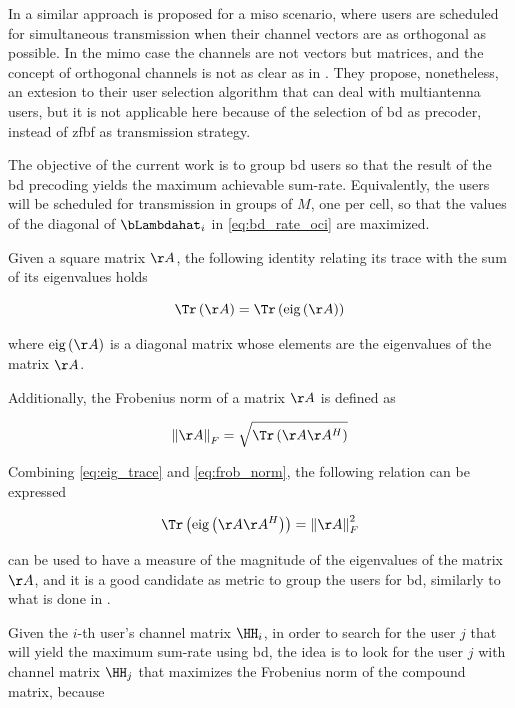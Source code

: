 In \cite{yoo06} a similar approach is proposed for a \gls{miso} scenario, where
users are scheduled for simultaneous transmission when their channel vectors are
as orthogonal as possible. In the \gls{mimo} case the channels are not vectors
but matrices, and the concept of orthogonal channels is not as clear as in
\cite{yoo06}. They propose, nonetheless, an extesion to their user selection
algorithm that can deal with multiantenna users, but it is not applicable here
because of the selection of \gls{bd} as precoder, instead of \gls{zfbf} as
transmission strategy.

The objective of the current work is to group \gls{bd} users so that the result
of the \gls{bd} precoding yields the maximum achievable sum-rate. Equivalently,
the users will be scheduled for transmission in groups of $M$, \ie one per cell,
so that the values of the diagonal of $\bLambdahat_i$ in \eqref{eq:bd_rate_oci}
are maximized.

Given a square matrix $\AA$, the following identity relating its trace with the
sum of its eigenvalues holds

\begin{equation} \label{eq:eig_trace}
    \Tr\left(\AA\right) = \Tr\left(\text{eig}\left(\AA\right)\right)
\end{equation}

\noindent
where $\text{eig}\left(\AA\right)$ is a diagonal matrix whose elements are the
eigenvalues of the matrix $\AA$.

Additionally, the Frobenius norm of a matrix $\AA$ is defined as

\begin{equation} \label{eq:frob_norm}
    \left\|\AA\right\|_F = \sqrt{\Tr\left(\AA\AA^H\right)}
\end{equation}

Combining \eqref{eq:eig_trace} and \eqref{eq:frob_norm}, the following relation
can be expressed

\begin{equation} \label{eq:eig_frob}
    \Tr\left(\text{eig}\left(\AA\AA^H\right)\right) = \left\|\AA\right\|_F^2
\end{equation}

\noindent
can be used to have a measure of the magnitude of the eigenvalues of the matrix
$\AA$, and it is a good candidate as metric to group the users for \gls{bd},
similarly to what is done in \cite{shen06}.

Given the $i$-th user's channel matrix $\HH_i$, in order to search for the user
$j$ that will yield the maximum sum-rate using \gls{bd}, the idea is to look for
the user $j$ with channel matrix $\HH_j$ that maximizes the Frobenius norm of
the compound matrix, because

